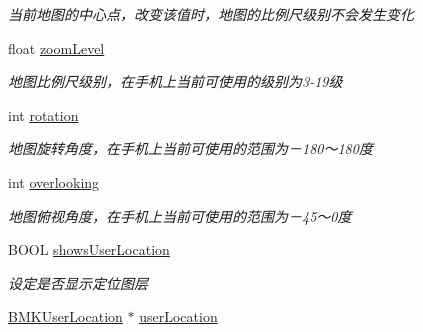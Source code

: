 \begin{DoxyCompactItemize}
\begin{DoxyCompactList}\small\item\em 当前地图的中心点，改变该值时，地图的比例尺级别不会发生变化 \end{DoxyCompactList}\item 
\hypertarget{interface_b_m_k_map_view_a5e6c1e21fddd4d6a24194be53f14c27e}{float \hyperlink{interface_b_m_k_map_view_a5e6c1e21fddd4d6a24194be53f14c27e}{zoom\-Level}}\label{interface_b_m_k_map_view_a5e6c1e21fddd4d6a24194be53f14c27e}

\begin{DoxyCompactList}\small\item\em 地图比例尺级别，在手机上当前可使用的级别为3-\/19级 \end{DoxyCompactList}\item 
\hypertarget{interface_b_m_k_map_view_a344d3d4be5d00adfc22feaa2ab6869c4}{int \hyperlink{interface_b_m_k_map_view_a344d3d4be5d00adfc22feaa2ab6869c4}{rotation}}\label{interface_b_m_k_map_view_a344d3d4be5d00adfc22feaa2ab6869c4}

\begin{DoxyCompactList}\small\item\em 地图旋转角度，在手机上当前可使用的范围为－180～180度 \end{DoxyCompactList}\item 
\hypertarget{interface_b_m_k_map_view_a8ae6f6cf221ea4f14923150d8974f997}{int \hyperlink{interface_b_m_k_map_view_a8ae6f6cf221ea4f14923150d8974f997}{overlooking}}\label{interface_b_m_k_map_view_a8ae6f6cf221ea4f14923150d8974f997}

\begin{DoxyCompactList}\small\item\em 地图俯视角度，在手机上当前可使用的范围为－45～0度 \end{DoxyCompactList}\item 
\hypertarget{interface_b_m_k_map_view_af0b1358b03cf2e760d58c96dc50d3ebe}{B\-O\-O\-L \hyperlink{interface_b_m_k_map_view_af0b1358b03cf2e760d58c96dc50d3ebe}{shows\-User\-Location}}\label{interface_b_m_k_map_view_af0b1358b03cf2e760d58c96dc50d3ebe}

\begin{DoxyCompactList}\small\item\em 设定是否显示定位图层 \end{DoxyCompactList}\item 
\hypertarget{interface_b_m_k_map_view_a165690d8952edbf58fd33101d3d169e8}{\hyperlink{interface_b_m_k_user_location}{B\-M\-K\-User\-Location} $\ast$ \hyperlink{interface_b_m_k_map_view_a165690d8952edbf58fd33101d3d169e8}{user\-Location}}\label{interface_b_m_k_map_view_a165690d8952edbf58fd33101d3d169e8}


\end{DoxyCompactItemize}
